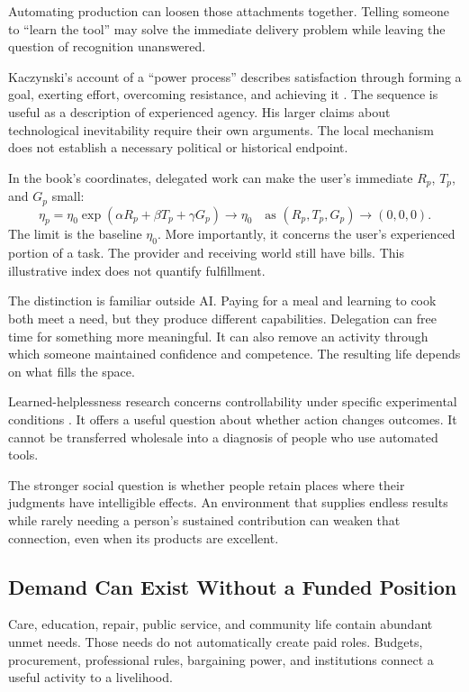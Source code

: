 \documentclass[11pt,openany]{book}
\begin{document}
Automating production can loosen those attachments together. Telling someone to “learn the tool” may solve the immediate delivery problem while leaving the question of recognition unanswered.

Kaczynski's account of a “power process” describes satisfaction through forming a goal, exerting effort, overcoming resistance, and achieving it \cite{kaczynski1995industrial}. The sequence is useful as a description of experienced agency. His larger claims about technological inevitability require their own arguments. The local mechanism does not establish a necessary political or historical endpoint.

In the book's coordinates, delegated work can make the user's immediate $R_p$, $T_p$, and $G_p$ small:
\begin{equation}
 \eta_p=\eta_0
 \exp(\alpha R_p+\beta T_p+\gamma G_p)
 \longrightarrow\eta_0
 \quad\text{as }(R_p,T_p,G_p)\to(0,0,0).
\end{equation}
The limit is the baseline $\eta_0$. More importantly, it concerns the user's experienced portion of a task. The provider and receiving world still have bills. This illustrative index does not quantify fulfillment.

The distinction is familiar outside AI. Paying for a meal and learning to cook both meet a need, but they produce different capabilities. Delegation can free time for something more meaningful. It can also remove an activity through which someone maintained confidence and competence. The resulting life depends on what fills the space.

Learned-helplessness research concerns controllability under specific experimental conditions \cite{seligman1967failure,maier2016learned}. It offers a useful question about whether action changes outcomes. It cannot be transferred wholesale into a diagnosis of people who use automated tools.

The stronger social question is whether people retain places where their judgments have intelligible effects. An environment that supplies endless results while rarely needing a person's sustained contribution can weaken that connection, even when its products are excellent.

\subsection{Demand Can Exist Without a Funded Position}

Care, education, repair, public service, and community life contain abundant unmet needs. Those needs do not automatically create paid roles. Budgets, procurement, professional rules, bargaining power, and institutions connect a useful activity to a livelihood.
\end{document}
